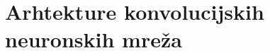 
\chapter{Arhtekture konvolucijskih neuronskih mreža}\label{ch:arhtekture-konvolucijskih-neuronskih-mreza}

